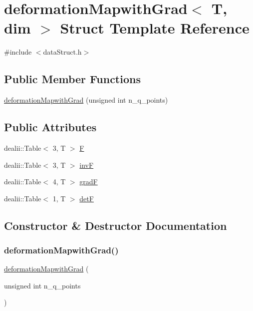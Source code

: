 \section{deformation\+Mapwith\+Grad$<$ T, dim $>$ Struct Template Reference}
\label{structdeformation_mapwith_grad}


{\ttfamily \#include $<$data\+Struct.\+h$>$}

\subsection*{Public Member Functions}
\begin{DoxyCompactItemize}
\item 
\mbox{\hyperlink{structdeformation_mapwith_grad_a2c6e68ea962afdc7927d312d097d0bd8}{deformation\+Mapwith\+Grad}} (unsigned int n\+\_\+q\+\_\+points)
\end{DoxyCompactItemize}
\subsection*{Public Attributes}
\begin{DoxyCompactItemize}
\item 
dealii\+::\+Table$<$ 3, T $>$ \mbox{\hyperlink{structdeformation_mapwith_grad_a7934bed7ba72b5e4a3af1fd8a4e14198}{F}}
\item 
dealii\+::\+Table$<$ 3, T $>$ \mbox{\hyperlink{structdeformation_mapwith_grad_ae40deb9e4616ec6d0b77519e56646ce0}{invF}}
\item 
dealii\+::\+Table$<$ 4, T $>$ \mbox{\hyperlink{structdeformation_mapwith_grad_a5bd7f05522c7d581d02e4de55682f5f2}{gradF}}
\item 
dealii\+::\+Table$<$ 1, T $>$ \mbox{\hyperlink{structdeformation_mapwith_grad_aa1ff2dc8fb6f4f6e9125ca026505a977}{detF}}
\end{DoxyCompactItemize}


\subsection{Constructor \& Destructor Documentation}
\mbox{\label{structdeformation_mapwith_grad_a2c6e68ea962afdc7927d312d097d0bd8}} 
\subsubsection{\texorpdfstring{deformation\+Mapwith\+Grad()}{deformationMapwithGrad()}}
{\footnotesize\ttfamily \mbox{\hyperlink{structdeformation_mapwith_grad}{deformation\+Mapwith\+Grad}} (\begin{DoxyParamCaption}\item[{unsigned int}]{n\+\_\+q\+\_\+points }\end{DoxyParamCaption})\hspace{0.3cm}{\ttfamily [inline]}}




